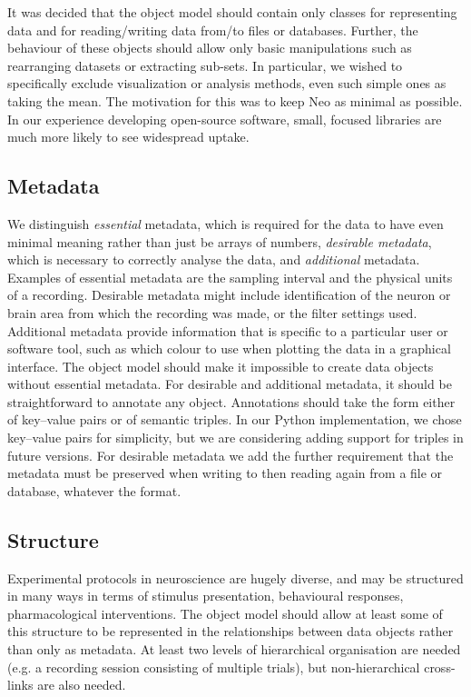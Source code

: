 \documentclass{frontiers}
\begin{document}
It was decided that the object model should contain only classes for representing data and for reading/writing data from/to files or databases. Further, the behaviour of these objects should allow only basic manipulations such as rearranging datasets or extracting sub-sets. In particular, we wished to specifically exclude visualization or analysis methods, even such simple ones as taking the mean. The motivation for this was to keep Neo as minimal as possible. In our experience developing open-source software, small, focused libraries are much more likely to see widespread uptake.

\subsection{Metadata}

We distinguish \emph{essential} metadata, which is required for the data to have even minimal meaning rather than just be arrays of numbers, \emph{desirable metadata}, which is necessary to correctly analyse the data, and \emph{additional} metadata.
Examples of essential metadata are the sampling interval and the physical units of a recording.
Desirable metadata might include identification of the neuron or brain area from which the recording was made, or the filter settings used.
Additional metadata provide information that is specific to a particular user or software tool, such as which colour to use when plotting the data in a graphical interface.
The object model should make it impossible to create data objects without essential metadata.
For desirable and additional metadata, it should be straightforward to annotate any object. 
Annotations should take the form either of key--value pairs or of semantic triples. 
In our Python implementation, we chose key--value pairs for simplicity, but we are considering adding support for triples in future versions.
For desirable metadata we add the further requirement that the metadata must be preserved when writing to then reading again from a file or database, whatever the format.

\subsection{Structure}

Experimental protocols in neuroscience are hugely diverse, and may be structured in many ways in terms of stimulus presentation, behavioural responses, pharmacological interventions. The object model should allow at least some of this structure to be represented in the relationships between data objects rather than only as metadata. At least two levels of hierarchical organisation are needed (e.g. a recording session consisting of multiple trials), but non-hierarchical cross-links are also needed.
\end{document}

